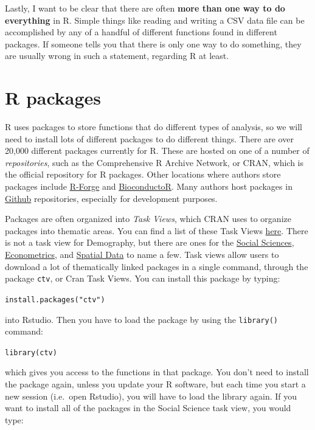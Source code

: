 \documentclass[
]{book}
\begin{document}
Lastly, I want to be clear that there are often \textbf{more than one way to
do everything} in R. Simple things like reading and writing a CSV data
file can be accomplished by any of a handful of different functions
found in different packages. If someone tells you that there is only one
way to do something, they are usually wrong in such a statement,
regarding R at least.

\hypertarget{r-packages}{%
\section{R packages}\label{r-packages}}

R uses packages to store functions that do different types of analysis,
so we will need to install lots of different packages to do different
things. There are over 20,000 different packages currently for R. These
are hosted on one of a number of \emph{repositories}, such as the
Comprehensive R Archive Network, or CRAN, which is the official
repository for R packages. Other locations where authors store packages
include \href{\%22https://r-forge.r-project.org/\%22}{R-Forge} and
\href{\%22https://www.bioconductor.org/\%22}{BioconductoR}. Many authors host
packages in \href{\%22https://github.com\%22}{Github} repositories, especially
for development purposes.

Packages are often organized into \emph{Task Views}, which CRAN uses to
organize packages into thematic areas. You can find a list of these Task
Views \href{\%22https://cran.r-project.org/web/views/\%22}{here}. There is not
a task view for Demography, but there are ones for the \href{\%22https://cran.r-project.org/web/views/SocialSciences.html\%22}{Social
Sciences},
\href{\%22https://cran.r-project.org/web/views/Econometrics.html\%22}{Econometrics},
and \href{\%22https://cran.r-project.org/web/views/Spatial.html\%22}{Spatial
Data} to name a
few. Task views allow users to download a lot of thematically linked
packages in a single command, through the package \texttt{ctv}, or Cran Task
Views. You can install this package by typing:

\texttt{install.packages("ctv")}

into Rstudio. Then you have to load the package by using the \texttt{library()}
command:

\texttt{library(ctv)}

which gives you access to the functions in that package. You don't need
to install the package again, unless you update your R software, but
each time you start a new session (i.e.~open Rstudio), you will have to
load the library again. If you want to install all of the packages in
the Social Science task view, you would type:
\end{document}
